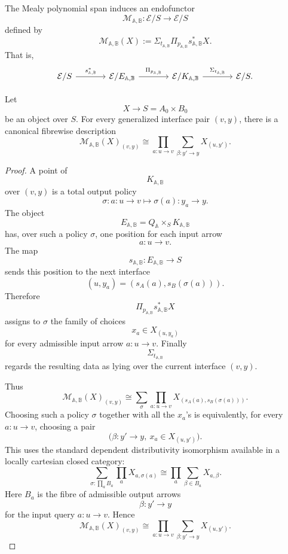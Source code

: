 The Mealy polynomial span induces an endofunctor
\[
\mathcal M_{\mathbb A,\mathbb B}:\mathcal E/S\to\mathcal E/S
\]
defined by
\[
\mathcal M_{\mathbb A,\mathbb B}(X)
:=
\Sigma_{t_{\mathbb A,\mathbb B}}
\Pi_{p_{\mathbb A,\mathbb B}}
s_{\mathbb A,\mathbb B}^{\ast}X.
\]
That is,
\[
\begin{tikzcd}[column sep=large]
\mathcal E/S
  \arrow[r, "s_{\mathbb A,\mathbb B}^{\ast}"]
&
\mathcal E/E_{\mathbb A,\mathbb B}
  \arrow[r, "\Pi_{p_{\mathbb A,\mathbb B}}"]
&
\mathcal E/K_{\mathbb A,\mathbb B}
  \arrow[r, "\Sigma_{t_{\mathbb A,\mathbb B}}"]
&
\mathcal E/S .
\end{tikzcd}
\]

\begin{proposition}
\label{prop:mealy-polynomial-fibre}
Let
\[
X\to S=A_0\times B_0
\]
be an object over \(S\). For every generalized interface pair \((v,y)\),
there is a canonical fibrewise description
\[
\mathcal M_{\mathbb A,\mathbb B}(X)_{(v,y)}
\cong
\prod_{a:u\to v}
\sum_{\beta:y'\to y}
X_{(u,y')}.
\]
\end{proposition}

\begin{proof}
A point of
\[
K_{\mathbb A,\mathbb B}
\]
over \((v,y)\) is a total output policy
\[
\sigma:
a:u\to v
\longmapsto
\sigma(a):y_a\to y.
\]
The object
\[
E_{\mathbb A,\mathbb B}
=
Q_{\mathbb A}\times_S K_{\mathbb A,\mathbb B}
\]
has, over such a policy \(\sigma\), one position for each input arrow
\[
a:u\to v.
\]
The map
\[
s_{\mathbb A,\mathbb B}:E_{\mathbb A,\mathbb B}\to S
\]
sends this position to the next interface
\[
(u,y_a)
=
(s_A(a),s_B(\sigma(a))).
\]
Therefore
\[
\Pi_{p_{\mathbb A,\mathbb B}}
s_{\mathbb A,\mathbb B}^{\ast}X
\]
assigns to \(\sigma\) the family of choices
\[
x_a\in X_{(u,y_a)}
\]
for every admissible input arrow \(a:u\to v\). Finally
\[
\Sigma_{t_{\mathbb A,\mathbb B}}
\]
regards the resulting data as lying over the current interface \((v,y)\).

Thus
\[
\mathcal M_{\mathbb A,\mathbb B}(X)_{(v,y)}
\cong
\sum_{\sigma}
\prod_{a:u\to v}
X_{(s_A(a),s_B(\sigma(a)))}.
\]
Choosing such a policy \(\sigma\) together with all the \(x_a\)'s is
equivalently, for every \(a:u\to v\), choosing a pair
\[
\bigl(\beta:y'\to y,\ x_a\in X_{(u,y')}\bigr).
\]
This uses the standard dependent distributivity isomorphism available in
a locally cartesian closed category:
\[
\sum_{\sigma:\prod_a B_a}
\prod_a X_{a,\sigma(a)}
\cong
\prod_a
\sum_{\beta\in B_a}X_{a,\beta}.
\]
Here \(B_a\) is the fibre of admissible output arrows
\[
\beta:y'\to y
\]
for the input query \(a:u\to v\). Hence
\[
\mathcal M_{\mathbb A,\mathbb B}(X)_{(v,y)}
\cong
\prod_{a:u\to v}
\sum_{\beta:y'\to y}
X_{(u,y')}.
\]
\end{proof}

